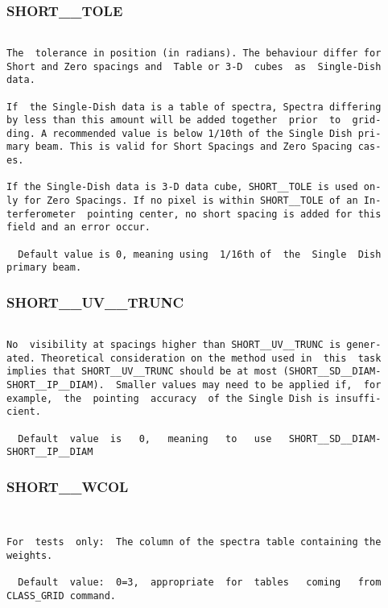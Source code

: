 \subsubsection{SHORT\_\_TOLE}
\begin{verbatim}

The  tolerance in position (in radians). The behaviour differ for
Short and Zero spacings and  Table or 3-D  cubes  as  Single-Dish
data.

If  the Single-Dish data is a table of spectra, Spectra differing
by less than this amount will be added together  prior  to  grid-
ding. A recommended value is below 1/10th of the Single Dish pri-
mary beam. This is valid for Short Spacings and Zero Spacing cas-
es.

If the Single-Dish data is 3-D data cube, SHORT__TOLE is used on-
ly for Zero Spacings. If no pixel is within SHORT__TOLE of an In-
terferometer  pointing center, no short spacing is added for this
field and an error occur.

  Default value is 0, meaning using  1/16th of  the  Single  Dish
primary beam.

\end{verbatim}
\subsubsection{SHORT\_\_UV\_\_TRUNC}
\begin{verbatim}

No  visibility at spacings higher than SHORT__UV__TRUNC is gener-
ated. Theoretical consideration on the method used in  this  task
implies that SHORT__UV__TRUNC should be at most (SHORT__SD__DIAM-
SHORT__IP__DIAM).  Smaller values may need to be applied if,  for
example,  the  pointing  accuracy  of the Single Dish is insuffi-
cient.

  Default  value  is   0,   meaning   to   use   SHORT__SD__DIAM-
SHORT__IP__DIAM

\end{verbatim}
\subsubsection{SHORT\_\_WCOL}
\begin{verbatim}


For  tests  only:  The column of the spectra table containing the
weights.

  Default  value:  0=3,  appropriate  for  tables   coming   from
CLASS_GRID command.

\end{verbatim}
